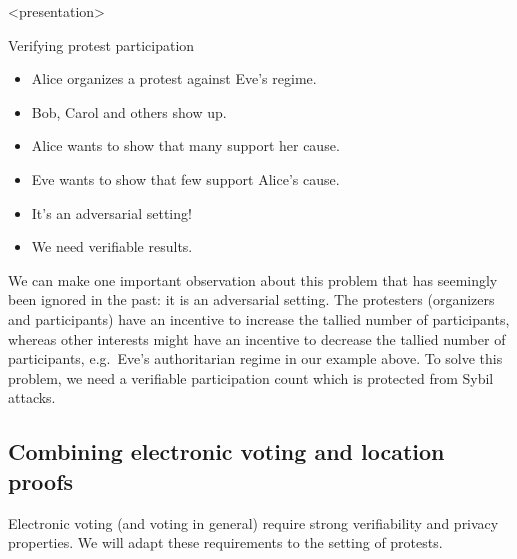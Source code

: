 \begin{frame}<presentation>
  \begin{block}{Verifying protest participation}
    \begin{itemize}
      \item Alice organizes a protest against Eve's regime.
      \item Bob, Carol and others show up.

        \pause{}

      \item {\color{green} Alice wants to show that many support her cause.}

        \pause{}

      \item {\color{red} Eve wants to show that few support Alice's cause.}
      \item It's an adversarial setting!
      \item We need verifiable results.
    \end{itemize}
  \end{block}
\end{frame}

We can make one important observation about this problem that has seemingly 
been ignored in the past: it is an adversarial setting.
The protesters (organizers and participants) have an incentive to increase the 
tallied number of participants, whereas other interests might have an incentive 
to decrease the tallied number of participants, e.g.\ Eve's authoritarian 
regime in our example above.
To solve this problem, we need a verifiable participation count which is 
protected from Sybil attacks.

\subsection{Combining electronic voting and location proofs}

Electronic voting (and voting in general) require strong verifiability and 
privacy properties.
We will adapt these requirements to the setting of protests.


